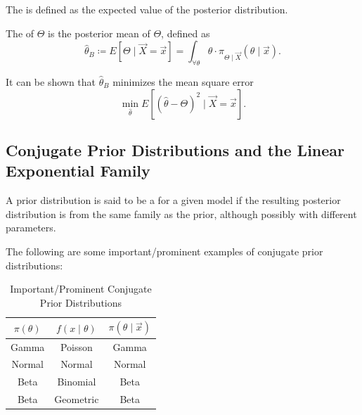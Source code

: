 \documentclass[notoc,notitlepage]{tufte-book}
\begin{document}
\begin{defn}\label{defn:posterior_mean}
  The  is defined as the expected value of the posterior
  distribution.
\end{defn}

\begin{defn}\label{defn:bayes_estimator}
  The  of $\Theta$ is the posterior mean of $\Theta$,
  defined as
  \begin{equation*}
    \hat{\theta}_B \coloneqq E[\Theta \mid \vec{X} = \vec{x}]
    = \int_{\forall \theta} \theta \cdot \pi_{\Theta \mid \vec{X}}(\theta \mid
    \vec{x}).
  \end{equation*}
\end{defn}

\begin{note}
  It can be shown that $\hat{\theta}_B$ minimizes the mean square error
  \begin{equation*}
    \min_{\hat{\theta}} E \left[ \left( \hat{\theta} - \Theta \right)^2 \mid
    \vec{X} = \vec{x} \right].
  \end{equation*}
\end{note}

\subsection{Conjugate Prior Distributions and the Linear Exponential Family}%
\label{sub:conjugate_prior_distributions_and_the_linear_exponential_family}

\begin{defn}\label{defn:conjugate_prior_distribution}
  A prior distribution is said to be a 
  for a given model if the resulting posterior distribution is from the same
  family as the prior, although possibly with different parameters.
\end{defn}

\begin{eg}\label{eg:conjugate_prior_distributions_egs}
  The following are some important/prominent examples of conjugate prior
  distributions:
  \begin{table}[ht]
    \centering
    \caption{Important/Prominent Conjugate Prior Distributions}
    \label{table:important_prominent_conjugate_prior_distributions}
    \begin{tabular}{c c c}
      $\pi(\theta)$ & $f(x \mid \theta)$ & $\pi(\theta \mid \vec{x})$ \\
      \hline
      Gamma         & Poisson            & Gamma \\
      Normal        & Normal             & Normal \\
      Beta          & Binomial           & Beta \\
      Beta          & Geometric          & Beta
    \end{tabular}
  \end{table}
\end{eg}
\end{document}
